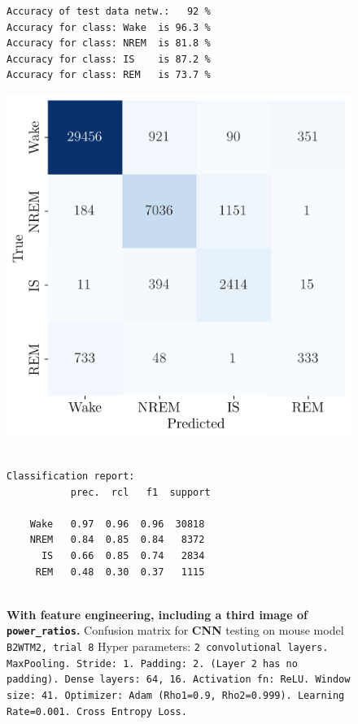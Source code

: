 \documentclass{article}
\begin{document}
\begin{figure}[H]
\begin{tcolorbox}[colframe=black, colback=white, sharp corners, boxrule=0.2mm, width=\textwidth]
\begin{minipage}[t]{0.48\textwidth}
{\begin{verbatim}
Accuracy of test data netw.:   92 %
Accuracy for class: Wake  is 96.3 %
Accuracy for class: NREM  is 81.8 %
Accuracy for class: IS    is 87.2 %
Accuracy for class: REM   is 73.7 %
        \end{verbatim}}
        \end{minipage}
        \hfill
        \begin{minipage}[t]{0.48\textwidth}
            \centering
            \includegraphics[width=\linewidth]{figures/conf_matrix_cnn_ratios_41_window_b2wtm2.png}
            \caption{\textbf{With feature engineering, including a third image of \texttt{power\_ratios}.} Confusion matrix for \textbf{CNN} testing on mouse model \texttt{B2WTM2, trial 8} Hyper parameters: \texttt{2 convolutional layers. MaxPooling. Stride: 1. Padding: 2. (Layer 2 has no padding). Dense layers: 64, 16. Activation fn: ReLU. Window size: 41. Optimizer: Adam (Rho1=0.9, Rho2=0.999). Learning Rate=0.001. Cross Entropy Loss.}}
            \label{fig:cnn_fe_cm2}
            \vspace{0.5cm}
            {\small
            \begin{verbatim}

Classification report:
           prec.  rcl   f1  support

    Wake   0.97  0.96  0.96  30818
    NREM   0.84  0.85  0.84   8372
      IS   0.66  0.85  0.74   2834
     REM   0.48  0.30  0.37   1115


\end{verbatim}}
\end{minipage}
\end{tcolorbox}
\end{figure}
\end{document}
